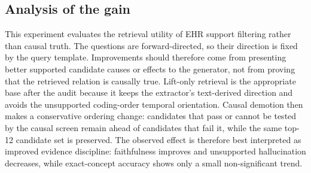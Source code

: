 \documentclass[runningheads]{llncs}
\begin{document}
\subsection{Analysis of the gain} 
This experiment evaluates the retrieval utility of EHR support filtering rather than causal truth. The questions are forward-directed, so their direction is fixed by the query template. Improvements should therefore come from presenting better supported candidate causes or effects to the generator, not from proving that the retrieved relation is causally true. Lift-only retrieval is the appropriate base after the audit because it keeps the extractor's text-derived direction and avoids the unsupported coding-order temporal orientation. Causal demotion then makes a conservative ordering change: candidates that pass or cannot be tested by the causal screen remain ahead of candidates that fail it, while the same top-12 candidate set is preserved. The observed effect is therefore best interpreted as improved evidence discipline: faithfulness improves and unsupported hallucination decreases, while exact-concept accuracy shows only a small non-significant trend.
\end{document}
